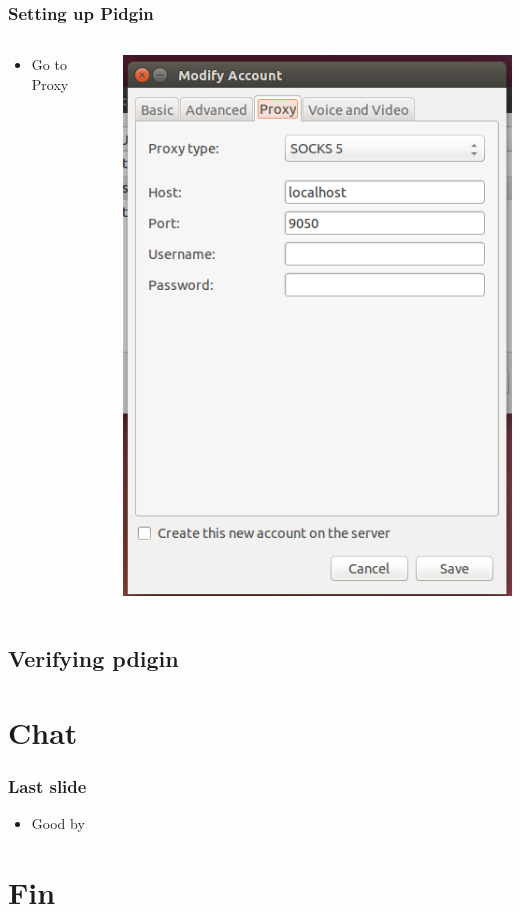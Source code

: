 \documentclass{beamer}
\begin{document}
\begin{frame}
\frametitle{Setting up Pidgin}
\begin{columns}
    \begin{column}{0.48\textwidth}
        \begin{itemize}
          \item Go to Proxy
        \end{itemize}
    \end{column}
    \begin{column}{.5\textwidth}
        \includegraphics[width=.9\linewidth]{pidgin_proxy}
    \end{column}
\end{columns}
\end{frame}
\subsection{Verifying pdigin}
\section{Chat}
\begin{frame}
\frametitle{Last slide}
\begin{itemize}
\item Good by
\end{itemize}
\end{frame}
\section{Fin}
\end{document}
